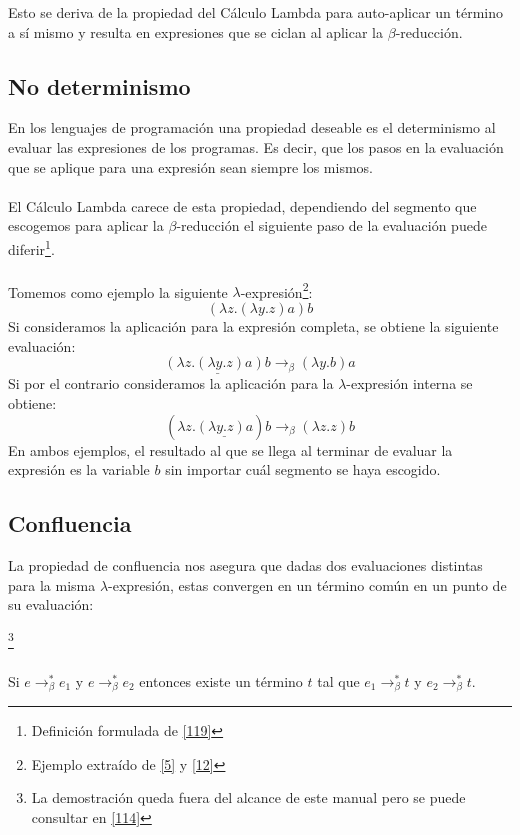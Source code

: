	Esto se deriva de la propiedad del Cálculo Lambda para auto-aplicar un término a sí mismo y resulta en expresiones que se ciclan al aplicar la $\beta$-reducción.

                \subsection{No determinismo}
                    En los lenguajes de programación una propiedad deseable es el determinismo al evaluar las expresiones de los programas. Es decir, que los pasos en la evaluación que se aplique para una expresión sean siempre los mismos.\\\\
 El Cálculo Lambda carece de esta propiedad, dependiendo del segmento que escogemos para aplicar la $\beta$-reducción el siguiente paso de la evaluación puede diferir\footnote{Definición formulada de \hyperlink{119}{[119]}}.\\\\
		   Tomemos como ejemplo la siguiente $\lambda$-expresión\footnote{Ejemplo extraído de \hyperlink{5}{[5]} y  \hyperlink{12}{[12]} }:
                    $$(\lambda z.(\lambda y.z)a)b$$
                    Si consideramos la aplicación para la expresión completa, se obtiene la siguiente evaluación: $$\underline{(\lambda z.(\lambda y.z)a)b} \rightarrow_\beta (\lambda y.b)a$$
                    Si por el contrario consideramos la aplicación para la $\lambda$-expresión interna se obtiene: $$(\lambda z.\underline{(\lambda y.z)a})b \rightarrow_\beta (\lambda z.z)b$$
                    En ambos ejemplos, el resultado al que se llega al terminar de evaluar la expresión es la variable $b$ sin importar cuál segmento se haya escogido.

                \subsection{Confluencia}
                    La propiedad de confluencia nos asegura que dadas dos evaluaciones distintas para la misma $\lambda$-expresión, estas convergen en un término común en un punto de su evaluación:

                    \begin{theorem}\footnote{La demostración queda fuera del alcance de este manual pero se puede consultar en \hyperlink{114}{[114]}}\\\\
 Si $e\to_\beta^* e_1$ y $e\to_\beta^*e_2$ entonces existe un término $t$ tal que  $e_1\to_\beta^* t$ y $e_2\to_\beta^* t$.
                    \end{theorem}

